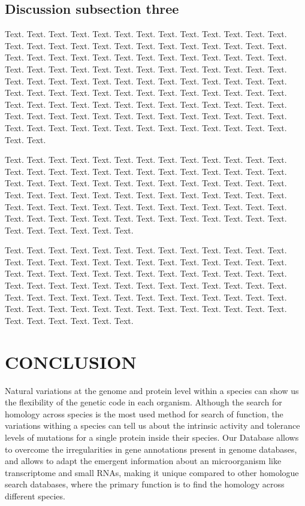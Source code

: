 \documentclass[a4,center,fleqn]{NAR}
\begin{document}
\subsection{Discussion subsection three}

Text. Text. Text. Text. Text. Text. Text. Text. Text. Text. Text.
Text. Text. Text. Text. Text. Text. Text. Text. Text. Text. Text.
Text. Text. Text. Text. Text. Text. Text. Text. Text. Text. Text.
Text. Text. Text. Text. Text. Text. Text. Text. Text. Text. Text.
Text. Text. Text. Text. Text. Text. Text. Text. Text. Text. Text.
Text. Text. Text. Text. Text. Text. Text. Text. Text. Text. Text.
Text. Text. Text. Text. Text. Text. Text. Text. Text. Text. Text.
Text. Text. Text. Text. Text. Text. Text. Text. Text. Text. Text.
Text. Text. Text. Text. Text. Text. Text. Text. Text. Text. Text.
Text. Text. Text. Text. Text. Text. Text. Text. Text. Text. Text.
Text. Text. Text. Text. Text. Text. Text. Text. Text.

Text. Text. Text. Text. Text. Text. Text. Text. Text. Text. Text.
Text. Text. Text. Text. Text. Text. Text. Text. Text. Text. Text.
Text. Text. Text. Text. Text. Text. Text. Text. Text. Text. Text.
Text. Text. Text. Text. Text. Text. Text. Text. Text. Text. Text.
Text. Text. Text. Text. Text. Text. Text. Text. Text. Text. Text.
Text. Text. Text. Text. Text. Text. Text. Text. Text. Text. Text.
Text. Text. Text. Text. Text. Text. Text. Text. Text. Text. Text.
Text. Text. Text. Text. Text. Text. Text.

Text. Text. Text. Text. Text. Text. Text. Text. Text. Text. Text.
Text. Text. Text. Text. Text. Text. Text. Text. Text. Text. Text.
Text. Text. Text. Text. Text. Text. Text. Text. Text. Text. Text.
Text. Text. Text. Text. Text. Text. Text. Text. Text. Text. Text.
Text. Text. Text. Text. Text. Text. Text. Text. Text. Text. Text.
Text. Text. Text. Text. Text. Text. Text. Text. Text. Text. Text.
Text. Text. Text. Text. Text. Text. Text. Text. Text. Text. Text.
Text. Text. Text. Text. Text. Text. Text.


\section{CONCLUSION}

Natural variations at the genome and protein level within a species can show us the flexibility of the genetic code in each organism. Although the search for homology across species is the most used method for search of  function, the variations withing a species can tell us about the intrinsic activity and tolerance levels of mutations for a single protein inside their species. Our Database allows to overcome the irregularities in gene annotations present in genome databases, and allows to adapt the emergent information about an microorganism like transcriptome and small RNAs, making it unique compared to other homologue search databases, where the primary function is to find the homology across different species.
\end{document}
